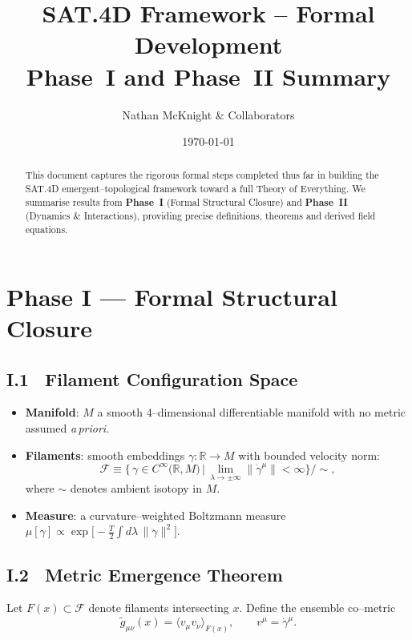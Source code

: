 \documentclass[11pt]{article}
\title{\textbf{SAT.4D Framework -- Formal Development}\\Phase~I and Phase~II Summary}
\author{Nathan McKnight \& Collaborators}
\date{\today}
\begin{document}
\maketitle

\begin{abstract}
This document captures the rigorous formal steps completed thus far in building the SAT.4D emergent--topological framework toward a full Theory of Everything.  We summarise results from \textbf{Phase~I} (Formal Structural Closure) and \textbf{Phase~II} (Dynamics \& Interactions), providing precise definitions, theorems and derived field equations.
\end{abstract}

\tableofcontents

\section{Phase I --- Formal Structural Closure}

\subsection{I.1~ Filament Configuration Space}
\label{sec:config_space}
\begin{itemize}
  \item \textbf{Manifold}: $M$ a smooth $4$--dimensional differentiable manifold with no metric assumed \emph{a\,priori}.
  \item \textbf{Filaments}: smooth embeddings $\gamma:\mathbb R \to M$ with bounded velocity norm:
  \[
      \mathcal F \equiv 
      \bigl\{\,\gamma \in C^\infty \!\bigl(\mathbb R,M\bigr)\,\bigl|\, 
      \lim_{\lambda\to\pm\infty}\!\!\bigl\lVert \dot\gamma^\mu\bigr\rVert < \infty
      \bigr\}\big/\!\sim,
  \]
  where $\sim$ denotes ambient isotopy in $M$.
  \item \textbf{Measure}: a curvature--weighted Boltzmann measure
  $
      \mu[\gamma] \propto
      \exp\bigl[-\tfrac{T}{2}\int d\lambda\,\|\ddot\gamma\|^2\bigr].
  $
\end{itemize}

\subsection{I.2~ Metric Emergence Theorem}
Let $F(x)\subset\mathcal F$ denote filaments intersecting $x$.  
Define the ensemble co--metric
\[
  \tilde g_{\mu\nu}(x)=\bigl\langle v_\mu v_\nu\bigr\rangle_{F(x)},\qquad 
  v^\mu=\dot\gamma^\mu.
\]
\end{document}

